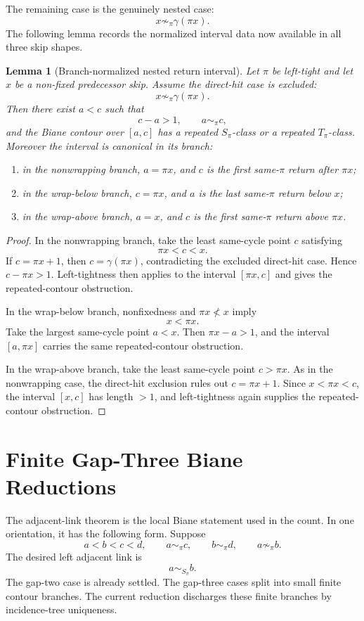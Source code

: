 \documentclass[11pt]{article}
\theoremstyle{plain}
\newtheorem{lemma}[theorem]{Lemma}
\theoremstyle{definition}
\theoremstyle{remark}
\newcommand{\g}{\gamma}
\newcommand{\p}{\pi}
\begin{document}
The remaining case is the genuinely nested case:
\[
  x\not\sim_\p \g(\p x).
\]
The following lemma records the normalized interval data now available in all
three skip shapes.

\begin{lemma}[Branch-normalized nested return interval]
Let \(\p\) be left-tight and let \(x\) be a non-fixed predecessor skip.  Assume
the direct-hit case is excluded:
\[
  x\not\sim_\p \g(\p x).
\]
Then there exist \(a<c\) such that
\[
  c-a>1,\qquad a\sim_\p c,
\]
and the Biane contour over \([a,c]\) has a repeated \(S_\p\)-class or a
repeated \(T_\p\)-class.  Moreover the interval is canonical in its branch:
\begin{enumerate}[label=(\roman*)]
\item in the nonwrapping branch, \(a=\p x\), and \(c\) is the first same-\(\p\)
return after \(\p x\);
\item in the wrap-below branch, \(c=\p x\), and \(a\) is the last same-\(\p\)
return below \(x\);
\item in the wrap-above branch, \(a=x\), and \(c\) is the first same-\(\p\)
return above \(\p x\).
\end{enumerate}
\end{lemma}

\begin{proof}
In the nonwrapping branch, take the least same-cycle point \(c\) satisfying
\[
  \p x<c<x.
\]
If \(c=\p x+1\), then \(c=\g(\p x)\), contradicting the excluded direct-hit
case.  Hence \(c-\p x>1\).  Left-tightness then applies to the interval
\([\p x,c]\) and gives the repeated-contour obstruction.

In the wrap-below branch, nonfixedness and \(\p x\not<x\) imply
\[
  x<\p x.
\]
Take the largest same-cycle point \(a<x\).  Then \(\p x-a>1\), and the
interval \([a,\p x]\) carries the same repeated-contour obstruction.

In the wrap-above branch, take the least same-cycle point \(c>\p x\).  As in
the nonwrapping case, the direct-hit exclusion rules out \(c=\p x+1\).  Since
\(x<\p x<c\), the interval \([x,c]\) has length \(>1\), and left-tightness
again supplies the repeated-contour obstruction.
\end{proof}

\section{Finite Gap-Three Biane Reductions}

The adjacent-link theorem is the local Biane statement used in the count.  In
one orientation, it has the following form.  Suppose
\[
  a<b<c<d,\qquad a\sim_\p c,\qquad b\sim_\p d,
  \qquad a\not\sim_\p b.
\]
The desired left adjacent link is
\[
  a\sim_{S_\p} b.
\]
The gap-two case is already settled.  The gap-three cases split into small
finite contour branches.  The current reduction discharges these finite
branches by incidence-tree uniqueness.
\end{document}
